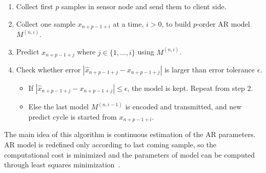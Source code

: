 \begin{enumerate}
    \item Collect first $p$ samples in sensor node and send them to client side.
    \item Collect one sample $x_{n+p-1+i}$ at a time, $i > 0$, to build
    $p$-order
    AR model $M^{(n, i)}$.
    \item Predict $x_{n+p-1+j}$ where $j \in \{1, ..., i\}$ using $M^{(n, i)}$.
    \item Check whether error $ |\hat{x}_{n+p-1+j} - x_{n+p-1+j}|$ is larger
    than error tolerance $\epsilon$.
        \begin{itemize}
            \item If $|\hat{x}_{n+p-1+j} - x_{n+p-1+j}| \leqslant \epsilon$, the
            model is kept. Repeat from step 2.
            \item Else the last model $M^{(n, i-1)}$ is encoded and transmitted,
            and new predict cycle is started from $x_{n+p-1+i}$.
        \end{itemize} 
\end{enumerate}
The main idea of this algorithm is continuous estimation of the AR parameters.
AR model is redefined only according to last coming sample, so the computational
cost is minimized and the parameters of model can be computed through least
squares minimization~\cite{zordan2012compress}. 
